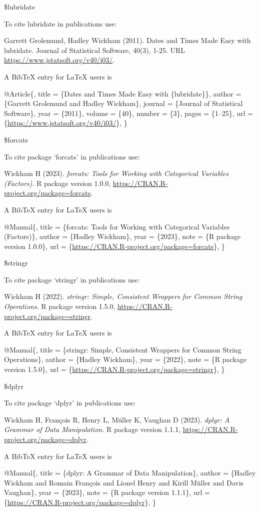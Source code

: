 \documentclass[
]{article}
\begin{document}
\$lubridate

To cite lubridate in publications use:

Garrett Grolemund, Hadley Wickham (2011). Dates and Times Made Easy with
lubridate. Journal of Statistical Software, 40(3), 1-25. URL
\url{https://www.jstatsoft.org/v40/i03/}.

A BibTeX entry for LaTeX users is

@Article\{, title = \{Dates and Times Made Easy with \{lubridate\}\},
author = \{Garrett Grolemund and Hadley Wickham\}, journal = \{Journal
of Statistical Software\}, year = \{2011\}, volume = \{40\}, number =
\{3\}, pages = \{1--25\}, url =
\{\url{https://www.jstatsoft.org/v40/i03/}\}, \}

\$forcats

To cite package `forcats' in publications use:

Wickham H (2023). \emph{forcats: Tools for Working with Categorical
Variables (Factors)}. R package version 1.0.0,
\url{https://CRAN.R-project.org/package=forcats}.

A BibTeX entry for LaTeX users is

@Manual\{, title = \{forcats: Tools for Working with Categorical
Variables (Factors)\}, author = \{Hadley Wickham\}, year = \{2023\},
note = \{R package version 1.0.0\}, url =
\{\url{https://CRAN.R-project.org/package=forcats}\}, \}

\$stringr

To cite package `stringr' in publications use:

Wickham H (2022). \emph{stringr: Simple, Consistent Wrappers for Common
String Operations}. R package version 1.5.0,
\url{https://CRAN.R-project.org/package=stringr}.

A BibTeX entry for LaTeX users is

@Manual\{, title = \{stringr: Simple, Consistent Wrappers for Common
String Operations\}, author = \{Hadley Wickham\}, year = \{2022\}, note
= \{R package version 1.5.0\}, url =
\{\url{https://CRAN.R-project.org/package=stringr}\}, \}

\$dplyr

To cite package `dplyr' in publications use:

Wickham H, François R, Henry L, Müller K, Vaughan D (2023). \emph{dplyr:
A Grammar of Data Manipulation}. R package version 1.1.1,
\url{https://CRAN.R-project.org/package=dplyr}.

A BibTeX entry for LaTeX users is

@Manual\{, title = \{dplyr: A Grammar of Data Manipulation\}, author =
\{Hadley Wickham and Romain François and Lionel Henry and Kirill Müller
and Davis Vaughan\}, year = \{2023\}, note = \{R package version
1.1.1\}, url = \{\url{https://CRAN.R-project.org/package=dplyr}\}, \}
\end{document}
